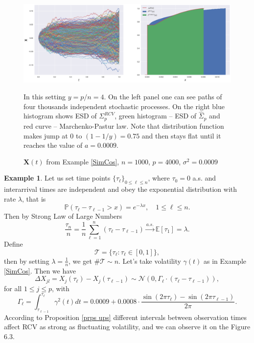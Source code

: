 \documentclass[a4paper,11pt]{book}
\theoremstyle{plain}
\theoremstyle{definition}
\newtheorem{exmp}[thm]{Example}
\newcommand{\ME}{\mathbb{E}}
\newcommand{\MP}{\mathbb{P}}
\begin{document}
    \begin{figure}[ht]
    	\begin{center} \centering
    		\includegraphics[scale=0.4]{XCos2}
    		\caption{ $\mathbf{X}(t)$ from Example \ref{SimCos}, $n = 1000$, $p=4000$, $\sigma^2 = 0.0009$ }
    		\smallskip
    		\small
    		In this setting $y = p/n = 4$. On the left panel one can see paths of four thousands independent stochastic processes. On the right blue histogram shows ESD of $\Sigma_p^{RCV}$, green histogram -- ESD of $\widehat{\Sigma}_p$ and red curve -- Marchenko-Pastur law. Note that distribution function makes jump at $0$ to $(1-1/y) = 0.75$ and then stays flat until it reaches the value of $a = 0.0009$.
    	\end{center}
    \end{figure}
    
    \begin{exmp} \label{PosTimes}
    	Let us set time points $ \{\tau_\ell\}_{0 \leq \ell \leq n}$, where $\tau_0 = 0$ a.s. and interarrival times are independent and obey the exponential distribution with rate $\lambda$, that is 
    	\[ \MP(\tau_{\ell} - \tau_{\ell-1} > x) =  e^{-\lambda x}, \quad 1 \leq \ell \leq n. \]
    	Then by Strong Law of Large Numbers
    	\[ \frac{\tau_n}{n} = \frac{1}{n} \sum_{\ell=1}^{n} (\tau_{\ell} - \tau_{\ell-1}) \xrightarrow{a.s.} \ME[\tau_1] = \lambda. \]
    	Define
    	\[ \mathcal{T} = \{\tau_\ell : \tau_\ell \in [0, 1]\}, \]
    	then by setting $\lambda = \frac{1}{n}$, we get $\#\mathcal{T} \sim n$.
    	Let's take volatility $\gamma(t)$ as in Example \ref{SimCos}. Then we have 
    	\[ \Delta X_{jl} = X_j(\tau_\ell) - X_j(\tau_{\ell-1}) \sim \mathcal{N}(0, \Gamma_\ell \cdot (\tau_\ell - \tau_{\ell-1})), \]
    	for all $1 \leq j \leq p$, with
    	\[ \Gamma_\ell = \int_{\tau_{\ell-1}}^{\tau_\ell} \gamma^2(t)dt = 0.0009 + 0.0008\cdot \frac{ \sin(2\pi \tau_\ell )-\sin(2\pi \tau_{\ell-1} ) }{2\pi}. \]
    	According to Proposition \ref{prps ups} different intervals between observation times affect RCV as strong as fluctuating volatility, and we can observe it on the Figure 6.3.
    \end{exmp}
    
\end{document}

